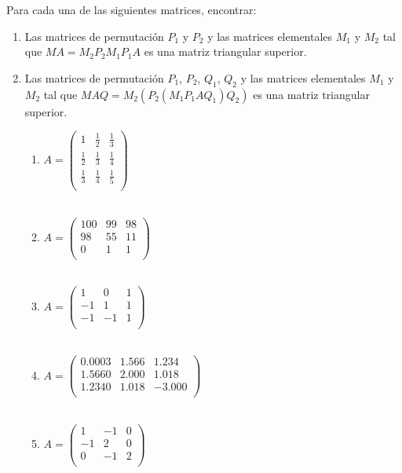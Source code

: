 Para cada una de las siguientes matrices, encontrar:
\begin{enumerate}[]
    \item Las matrices de permutación $P_1$ y $P_2$ y las matrices elementales $M_1$ y $M_2$ tal que $MA = M_2P_2M_1P_1A$ es una matriz triangular superior.
    
    \item Las matrices de permutación $P_1$, $P_2$, $Q_1$, $Q_2$ y las matrices elementales $M_1$ y $M_2$ tal que $MAQ = M_2(P_2(M_1P_1 A Q_1)Q_2)$ es una matriz triangular superior.
    
    \begin{enumerate}[]
            \item 
            $A = \begin{pmatrix}
                1 & \frac{1}{2} & \frac{1}{3} \\ 
                \frac{1}{2} & \frac{1}{3} & \frac{1}{4} \\
                \frac{1}{3} & \frac{1}{4} & \frac{1}{5} \\
            \end{pmatrix}$
            \\\\
            \item
            $A = \begin{pmatrix}
                100 & 99 & 98 \\ 
                98 & 55 & 11 \\
                0 & 1 & 1 \\
            \end{pmatrix}$
            \\\\
            \item
            $A = \begin{pmatrix}
                1 & 0 & 1 \\ 
                -1 & 1 & 1 \\
                -1 & -1 & 1 \\
            \end{pmatrix}$
            \\\\
            \item
            $A = \begin{pmatrix}
                0.0003 & 1.566 &  1.234 \\ 
                1.5660 & 2.000 &  1.018 \\
                1.2340 & 1.018 & -3.000 \\
            \end{pmatrix}$
            \\\\
            \item
            $A = \begin{pmatrix}
                1 & -1 & 0 \\ 
                -1 & 2 & 0 \\
                0 & -1 & 2 \\
            \end{pmatrix}$
        \end{enumerate}
    

\end{enumerate}
